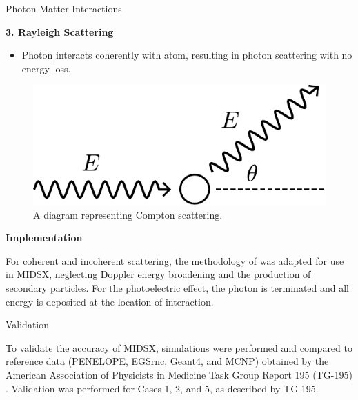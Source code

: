 \documentclass[final]{beamer}
\newlength{\colwidth}
\begin{document}
\begin{frame}[t]
\begin{columns}[t]
\begin{column}{\colwidth}
\begin{block}{Photon-Matter Interactions}
    \begin{center}
      \textbf{3. Rayleigh Scattering}
      \begin{itemize}
        \item Photon interacts coherently with atom, resulting in photon scattering with no energy loss.
      \end{itemize}
      \vspace{-1\baselineskip}
      \begin{figure}
        \includegraphics[width = 0.4\colwidth]{rayleigh_diagram.pdf}
        \caption{A diagram representing Compton scattering.}
      \end{figure}
    \end{center}
    \vspace{-\baselineskip}
  \end{block}

  \begin{center}
    \textbf{Implementation}
  \end{center}

  For coherent and incoherent scattering, the methodology of \cite{lund2018implementation} was adapted for use in MIDSX, neglecting Doppler energy broadening and the production of secondary particles. For the photoelectric effect, the photon is terminated and all energy is deposited at the location of interaction.

  \begin{block}{Validation}

    To validate the accuracy of MIDSX, simulations were performed and compared to reference data (PENELOPE, EGSrnc, Geant4, and MCNP) obtained by the American Association of Physicists in Medicine Task Group Report 195 (TG-195) \cite{sechopoulos_monte_2015}. Validation was performed for Cases 1, 2, and 5, as described by TG-195.


\end{block}
\end{column}
\end{columns}
\end{frame}
\end{document}
